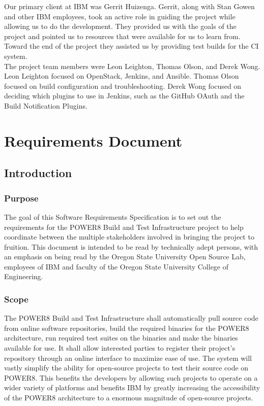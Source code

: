 \documentclass[10pt,letterpaper,onecolumn,draftclsnofoot]{IEEEtran}
\begin{document}
Our primary client at IBM was Gerrit Huizenga. Gerrit, along with Stan Gowen and
other IBM employees, took an active role in guiding the project while allowing us
to do the development. They provided us with the goals of the project and pointed
us to resources that were available for us to learn from. Toward the end of the
project they assisted us by providing test builds for the CI system. \\

The project team members were Leon Leighton, Thomas Olson, and Derek Wong. Leon
Leighton focused on OpenStack, Jenkins, and Ansible. Thomas Olson focused on build configuration and troubleshooting.
Derek Wong focused on deciding which plugins to use in Jenkins, such as the GitHub OAuth and the Build Notification Plugins. 

\section{Requirements Document}
\subsection{Introduction}
\subsubsection{Purpose}
The goal of this Software Requirements Specification is to set out the requirements for the POWER8 Build and Test Infrastructure project to help coordinate between the multiple stakeholders involved in bringing the project to fruition. This document is intended to be read by technically adept persons, with an emphasis on being read by the Oregon State University Open Source Lab, employees of IBM and faculty of the Oregon State University College of Engineering.
\subsubsection{Scope}
The POWER8 Build and Test Infrastructure shall automatically pull source code from online software repositories, build the required binaries for the POWER8 architecture, run required test suites on the binaries and make the binaries available for use. It shall allow interested parties to register their project's repository through an online interface to maximize ease of use. The system will vastly simplify the ability for open-source projects to test their source code on POWER8. This benefits the developers by allowing such projects to operate on a wider variety of platforms and benefits IBM by greatly increasing the accessibility of the POWER8 architecture to a enormous magnitude of open-source projects.
\end{document}
